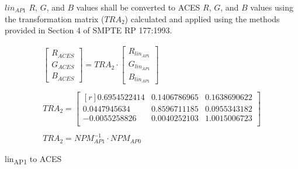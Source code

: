 $lin_{AP1}$ $R$, $G$, and $B$ values shall be converted to ACES $R$, $G$, and $B$ values using the transformation matrix ($TRA_{2}$) calculated and applied using the methods provided in Section 4 of SMPTE RP 177:1993.


\begin{floatequ} 
\begin{gather}
    \begin{bmatrix}
        R_{ACES}\\
        G_{ACES}\\
        B_{ACES}
    \end{bmatrix}
    =
    TRA_{2}
    \cdot
    \begin{bmatrix}
        R_{lin_{AP1}}\\
        G_{lin_{AP1}}\\
        B_{lin_{AP1}}
    \end{bmatrix} \\
    \\
    TRA_{2} =
    \begin{bmatrix*}[r]
        0.6954522414 & 0.1406786965 & 0.1638690622 \\
        0.0447945634 & 0.8596711185 & 0.0955343182 \\
        -0.0055258826 & 0.0040252103 & 1.0015006723 \\
    \end{bmatrix*} \\
    \\
    TRA_{2} = NPM^{-1}_{AP1} \cdot NPM_{AP0}
\end{gather}
\caption{lin\textsubscript{AP1} to ACES}
\label{eq:linAP12ACES}
\end{floatequ}
